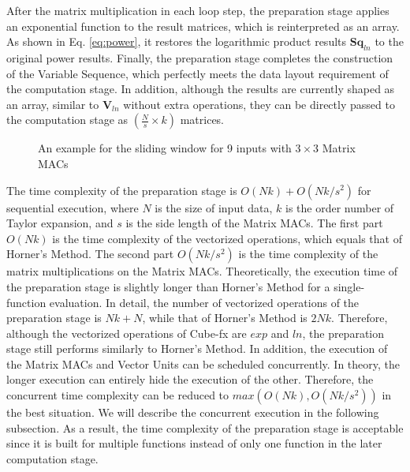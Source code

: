 After the matrix multiplication in each loop step, the preparation stage applies an exponential function to the result matrices, which is reinterpreted as an array. As shown in Eq. \ref{eq:power}, it restores the logarithmic product results $\textbf{Sq}_{ln}$ to the original power results. Finally, the preparation stage completes the construction of the Variable Sequence, which perfectly meets the data layout requirement of the computation stage. In addition, although the results are currently shaped as an array, similar to $\textbf{V}_{ln}$ without extra operations, they can be directly passed to the computation stage as $(\frac{N}{s} \times k)$ matrices.

\begin{figure}[t]
    \caption{An example for the sliding window for 9 inputs with $3 \times 3$ Matrix MACs}
    \label{fig:window}
    \end{figure}

The time complexity of the preparation stage is $O(Nk) + O(Nk / s^2)$ for sequential execution, where $N$ is the size of input data, $k$ is the order number of Taylor expansion, and $s$ is the side length of the Matrix MACs. The first part $O(Nk)$ is the time complexity of the vectorized operations, which equals that of Horner's Method. The second part $O(Nk / s^2)$ is the time complexity of the matrix multiplications on the Matrix MACs. Theoretically, the execution time of the preparation stage is slightly longer than Horner's Method for a single-function evaluation. In detail, the number of vectorized operations of the preparation stage is $Nk + N$, while that of Horner's Method is $2Nk$. Therefore, although the vectorized operations of Cube-fx are $exp$ and $ln$, the preparation stage still performs similarly to Horner's Method. In addition, the execution of the Matrix MACs and Vector Units can be scheduled concurrently. In theory, the longer execution can entirely hide the execution of the other. Therefore, the concurrent time complexity can be reduced to $max(O(Nk), O(Nk / s^2))$ in the best situation. We will describe the concurrent execution in the following subsection. As a result, the time complexity of the preparation stage is acceptable since it is built for multiple functions instead of only one function in the later computation stage. 

